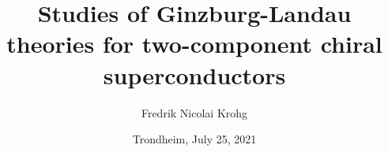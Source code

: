 

%
%



\author{Fredrik Nicolai Krohg}
\title{Studies of Ginzburg-Landau theories for two-component chiral superconductors}
\date{Trondheim, July 25, 2021}



    \maketitle
  \frontmatter
    
    
    
    
    \tableofcontents
  \mainmatter 
    
    
    
    
    
    
    
%    
     
  \backmatter
    \printbibliography
    

